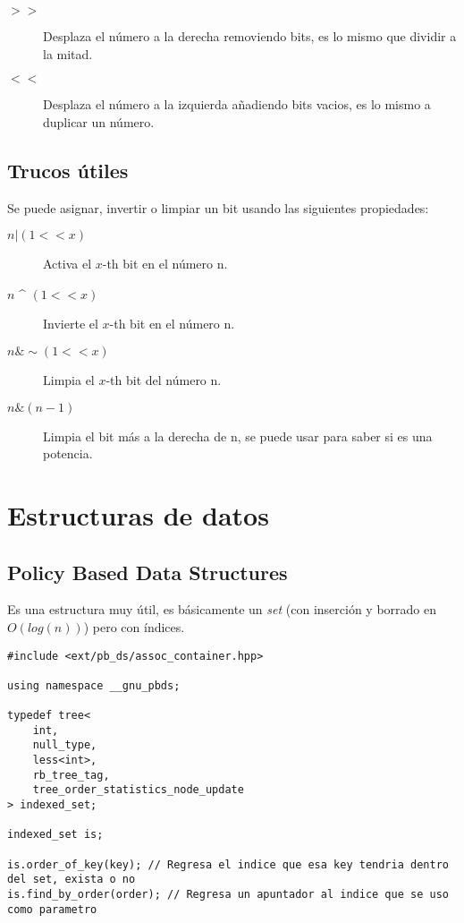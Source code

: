 \documentclass[10pt]{article}
\begin{document}
\begin{description}
    \item[$ >> $] Desplaza el número a la derecha removiendo bits, es lo mismo que dividir a la mitad.
    \item[$ << $] Desplaza el número a la izquierda añadiendo bits vacios, es lo mismo a duplicar un número.
\end{description}

\subsection{Trucos útiles}

Se puede asignar, invertir o limpiar un bit usando las siguientes propiedades:

\begin{description}
    \item[$ n | (1 << x) $] Activa el $x$-th bit en el número n.
    \item[$ n $ \^{} $ (1 << x) $] Invierte el $x$-th bit en el número n.
    \item[$ n \& \sim (1 << x) $] Limpia el $x$-th bit del número n.
    \item[$ n \& (n - 1) $] Limpia el bit más a la derecha de n, se puede usar para saber si es una potencia.
\end{description}

\section{Estructuras de datos}

\subsection{Policy Based Data Structures}

Es una estructura muy útil, es básicamente un \textit{set} (con inserción y borrado en $O(log(n))$) pero con índices.

\begin{lstlisting}
#include <ext/pb_ds/assoc_container.hpp>

using namespace __gnu_pbds;

typedef tree<
    int,
    null_type,
    less<int>,
    rb_tree_tag,
    tree_order_statistics_node_update
> indexed_set;

indexed_set is;

is.order_of_key(key); // Regresa el indice que esa key tendria dentro del set, exista o no
is.find_by_order(order); // Regresa un apuntador al indice que se uso como parametro
\end{lstlisting}
\end{document}
